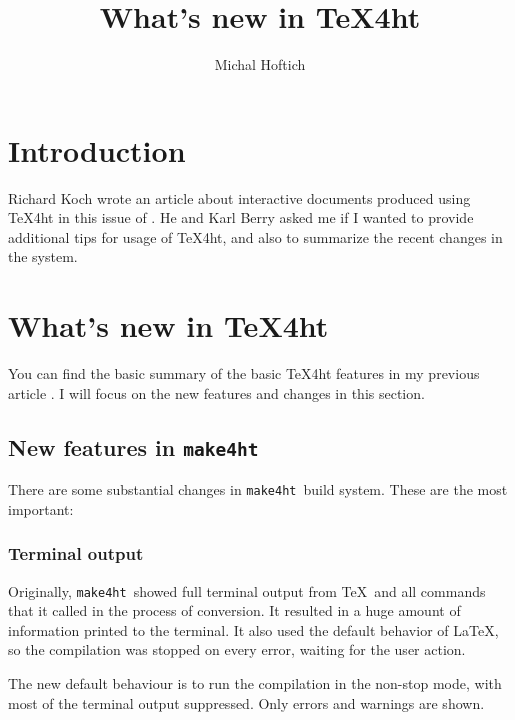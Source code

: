\documentclass{ltugboat}
\title{What's new in \TeX4ht}
\author{Michal Hoftich}
\newcommand\makefourht{\texttt{make4ht}}
\begin{document}
\maketitle

\begin{abstract}
\end{abstract}

\section{Introduction}

Richard Koch wrote an article about interactive documents produced using
\TeX4ht in this issue of \TUB. He and Karl Berry asked me if I wanted 
to provide additional tips for usage of \TeX4ht, and also to summarize
the recent changes in the system.


\hypertarget{Whatux27sux20newux20inux20TeX4ht}{%
\section{What's new in TeX4ht}\label{Whatux27sux20newux20inux20TeX4ht}}

You can find the basic summary of the basic \TeX4ht features in my previous article
\cite{Hoftich:2019:TLW}. I will focus on the new features and changes in this section.

\subsection{New features in \makefourht}

There are some substantial changes in \makefourht\ build system. These are the
most important:

\subsubsection{Terminal output}

Originally, \makefourht\ showed full terminal output from \TeX\ and all
commands that it called in the process of conversion. It resulted in a huge 
amount of information printed to the terminal. It also used the default 
behavior of \LaTeX, so the compilation was stopped on every error, waiting
for the user action.

The new default behaviour is to run the compilation in the non-stop mode, 
with most of the terminal output suppressed. Only errors and warnings are 
shown. 
\end{document}
